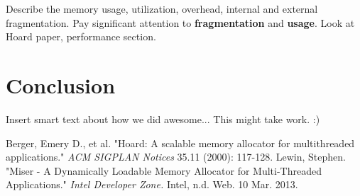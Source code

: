 \documentclass{article}
\begin{document}
Describe the memory usage, utilization, overhead, internal and external 
fragmentation. Pay significant attention to \textbf{fragmentation} and 
\textbf{usage}. Look at Hoard paper, performance section. 

\newpage
\section{Conclusion}
\label{sec:conclusion}

Insert smart text about how we did awesome... This might take work. :)

\newpage

\begin{thebibliography}{9}
	
		Berger, Emery D., et al.
		"Hoard: A scalable memory allocator for multithreaded applications."
		\textit{ACM SIGPLAN Notices} 35.11 
		(2000): 
		117-128.
		Lewin, Stephen.
		"Miser - A Dynamically Loadable Memory Allocator for Multi-Threaded Applications."
		\textit{Intel Developer Zone.}
		Intel, 
		n.d. Web. 10 Mar. 2013.

\end{thebibliography}
\end{document}
